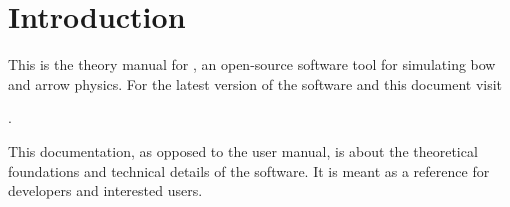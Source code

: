 \chapter{Introduction}

This is the theory manual for \swtitle, an open-source software tool for simulating bow and arrow physics.
For the latest version of the software and this document visit

\website.

This documentation, as opposed to the user manual, is about the theoretical foundations and technical details of the software.
It is meant as a reference for developers and interested users.